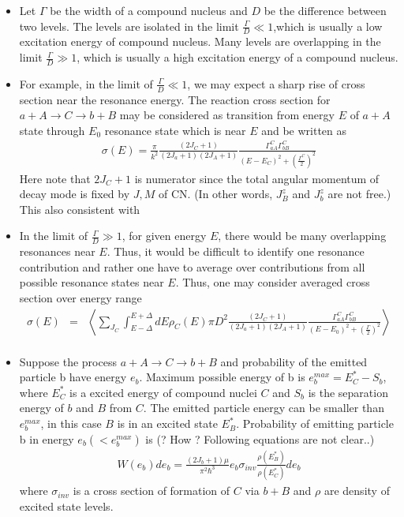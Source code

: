 \documentclass[11pt]{book}
\newcommand{\bea}{\begin{eqnarray}}
\newcommand{\eea}{\end{eqnarray}}
\newcommand{\no}{\nonumber \\}
\begin{document}
\begin{itemize}
	      
	\item Let $\Gamma$ be the width of a compound nucleus and $D$ be the difference between 
	      two levels. The levels are isolated in the limit $\frac{\Gamma}{D}\ll 1$,which is 
	      usually a low excitation energy of compound nucleus. Many levels are  overlapping 
	      in the limit $\frac{\Gamma}{D}\gg 1$, which is usually a high excitation energy of a compound nucleus. 
	\item For example, in the limit of $\frac{\Gamma}{D}\ll 1$, we may expect a sharp rise of cross section 
	      near the resonance energy. 
	      The reaction cross section for 
	      $a+ A\to C\to b+B$ may be considered as transition from energy $E$ of $a+A$ state
	      through $E_0$ resonance state which is near $E$ and be written as
	      \bea 
	      \sigma(E)=\frac{\pi}{k^2} \frac{(2J_C+1)}{(2J_a+1)(2J_A+1)}  \frac{\Gamma^C_{aA}\Gamma^C_{bB}}{(E-E_C)^2+(\frac{\Gamma^C}{2})^2}
	      \eea   
	      Here note that $2J_C+1$ is numerator since the total angular momentum of 
	      decay mode is fixed by $J,M$ of CN. (In other words, $J^z_B$ and $J^z_b$ are not free.)
	    This also consistent with 
	 \item In the limit of $\frac{\Gamma}{D}\gg 1$, for given energy $E$, 
	 there would be many overlapping resonances near $E$. 
	 Thus, it would be difficult to identify one resonance contribution and rather one have to average over contributions from all possible resonance states near $E$.
	  Thus, one may consider averaged cross section over energy range 
	  \bea 
	  \sigma(E)&=& \left\langle \sum_{J_C} \int_{E-\Delta}^{E+\Delta} dE \rho_C(E) 
	                \pi D^2\frac{(2J_C+1)}{(2J_a+1)(2J_A+1)}  \frac{\Gamma^C_{aA}\Gamma_{bB}^C}{(E-E_0)^2+(\frac{\Gamma}{2})^2} \right\rangle \no      
	  \eea         
	 \item Suppose the process $a+A\to C\to b+B$ and probability of the emitted particle b have energy $e_b$.
	       Maximum possible energy of b is $e_b^{max}=E_C^*-S_b$, where $E_C^*$ is a excited energy of compound nuclei $C$
	       and $S_b$ is the separation energy of $b$ and $B$ from $C$. The emitted particle energy can be smaller than 
	       $e_b^{max}$, in this case  $B$ is in an excited state $E_B^*$. 
	       Probability of emitting particle b in energy $e_b(< e_b^{max})$ is (? How ? Following equations are not clear..)
	       \bea 
	       W(e_b) de_b =\frac{(2J_b+1)\mu}{\pi^2\hbar^3} e_b \sigma_{inv} \frac{\rho(E_B^*)}{\rho(E_C^*)} d e_b
	       \eea 
	       where $\sigma_{inv}$ is a cross section of formation of $C$ via $b+B$ and $\rho$ are density of excited state levels.

\end{itemize}
\end{document}
